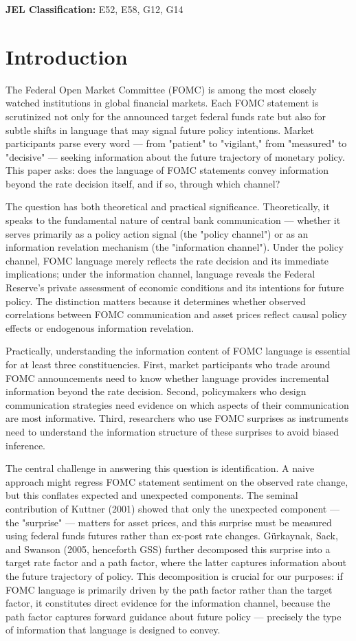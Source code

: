 \documentclass[12pt]{article}
\begin{document}
\textbf{JEL Classification:} E52, E58, G12, G14


\section{Introduction}

The Federal Open Market Committee (FOMC) is among the most closely watched institutions in global financial markets. Each FOMC statement is scrutinized not only for the announced target federal funds rate but also for subtle shifts in language that may signal future policy intentions. Market participants parse every word --- from "patient" to "vigilant," from "measured" to "decisive" --- seeking information about the future trajectory of monetary policy. This paper asks: does the language of FOMC statements convey information beyond the rate decision itself, and if so, through which channel?

The question has both theoretical and practical significance. Theoretically, it speaks to the fundamental nature of central bank communication --- whether it serves primarily as a policy action signal (the "policy channel") or as an information revelation mechanism (the "information channel"). Under the policy channel, FOMC language merely reflects the rate decision and its immediate implications; under the information channel, language reveals the Federal Reserve's private assessment of economic conditions and its intentions for future policy. The distinction matters because it determines whether observed correlations between FOMC communication and asset prices reflect causal policy effects or endogenous information revelation.

Practically, understanding the information content of FOMC language is essential for at least three constituencies. First, market participants who trade around FOMC announcements need to know whether language provides incremental information beyond the rate decision. Second, policymakers who design communication strategies need evidence on which aspects of their communication are most informative. Third, researchers who use FOMC surprises as instruments need to understand the information structure of these surprises to avoid biased inference.

The central challenge in answering this question is identification. A naive approach might regress FOMC statement sentiment on the observed rate change, but this conflates expected and unexpected components. The seminal contribution of Kuttner (2001) showed that only the unexpected component --- the "surprise" --- matters for asset prices, and this surprise must be measured using federal funds futures rather than ex-post rate changes. G\"urkaynak, Sack, and Swanson (2005, henceforth GSS) further decomposed this surprise into a target rate factor and a path factor, where the latter captures information about the future trajectory of policy. This decomposition is crucial for our purposes: if FOMC language is primarily driven by the path factor rather than the target factor, it constitutes direct evidence for the information channel, because the path factor captures forward guidance about future policy --- precisely the type of information that language is designed to convey.
\end{document}
